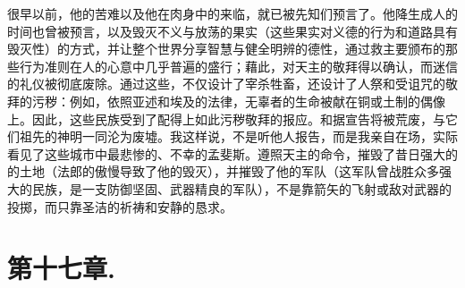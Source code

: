 很早以前，他的苦难以及他在肉身中的来临，就已被先知们预言了。他降生成人的时间也曾被预言，以及毁灭不义与放荡的果实（这些果实对义德的行为和道路具有毁灭性）的方式，并让整个世界分享智慧与健全明辨的德性，通过救主要颁布的那些行为准则在人的心意中几乎普遍的盛行；藉此，对天主的敬拜得以确认，而迷信的礼仪被彻底废除。通过这些，不仅设计了宰杀牲畜，还设计了人祭和受诅咒的敬拜的污秽：例如，依照亚述和埃及的法律，无辜者的生命被献在铜或土制的偶像上。因此，这些民族受到了配得上如此污秽敬拜的报应。和据宣告将被荒废，与它们祖先的神明一同沦为废墟。我这样说，不是听他人报告，而是我亲自在场，实际看见了这些城市中最悲惨的、不幸的孟斐斯。遵照天主的命令，摧毁了昔日强大的的土地（法郎的傲慢导致了他的毁灭），并摧毁了他的军队（这军队曾战胜众多强大的民族，是一支防御坚固、武器精良的军队），不是靠箭矢的飞射或敌对武器的投掷，而只靠圣洁的祈祷和安静的恳求。\par


\section{第十七章. }

